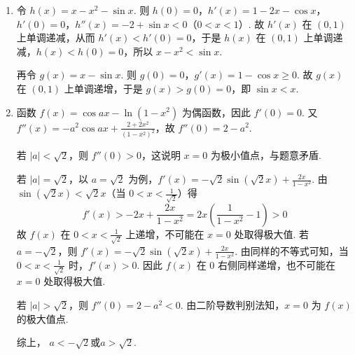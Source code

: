 \begin{solution}
\begin{enumerate}
\item 令 \(h(x)=x-x^2-\sin x\). 则 \(h(0)=0\)，\(h'(x)=1-2x-\cos x\)，\(h'(0)=0\)，\(h''(x)=-2+\sin x<0\)（\(0<x<1\)）.
故 \(h'(x)\) 在 \((0,1)\) 上单调递减，从而 \(h'(x)<h'(0)=0\)，于是 \(h(x)\) 在 \((0,1)\) 上单调递减，\(h(x)<h(0)=0\)，所以 \(x-x^2<\sin x\).

再令 \(g(x)=x-\sin x\). 则 \(g(0)=0\)，\(g'(x)=1-\cos x\ge 0\). 故 \(g(x)\) 在 \((0,1)\) 上单调递增，于是 \(g(x)>g(0)=0\)，即 \(\sin x<x\).

\item 函数 \(f(x)=\cos ax-\ln(1-x^2)\) 为偶函数，因此 \(f'(0)=0\). 又 \(f''(x)=-a^2\cos ax+\frac{2+2x^2}{(1-x^2)^2}\)，故 \(f''(0)=2-a^2\).

若 \(|a|<\sqrt2\)，则 \(f''(0)>0\)，这说明 \(x=0\) 为极小值点，与题意矛盾.

若 \(|a|=\sqrt2\)，以 \(a=\sqrt2\) 为例，\(f'(x)=-\sqrt2\sin(\sqrt2 x)+\frac{2x}{1-x^2}\). 由 \(\sin(\sqrt2 x)<\sqrt2 x\)（当 \(0<x<\frac{1}{\sqrt2}\)）得
\[
f'(x)>-2x+\frac{2x}{1-x^2}=2x\left(\frac{1}{1-x^2}-1\right)>0
\]
故 \(f(x)\) 在 \(0<x<\frac{1}{\sqrt2}\) 上递增，不可能在 \(x=0\) 处取得极大值. 若 \(a=-\sqrt2\)，则 \(f'(x)=-\sqrt2\sin(\sqrt2 x)+\frac{2x}{1-x^2}\). 由同样的不等式可知，当 \(0<x<\frac{1}{\sqrt2}\) 时，\(f'(x)>0\).
因此 \(f(x)\) 在 \(0\) 右侧同样递增，也不可能在 \(x=0\) 处取得极大值.

若 \(|a|>\sqrt2\)，则 \(f''(0)=2-a^2<0\).
由二阶导数判别法知，\(x=0\) 为 \(f(x)\) 的极大值点.

综上，
\(a<-\sqrt2\)或\(a>\sqrt2\).
\end{enumerate}
\end{solution}
